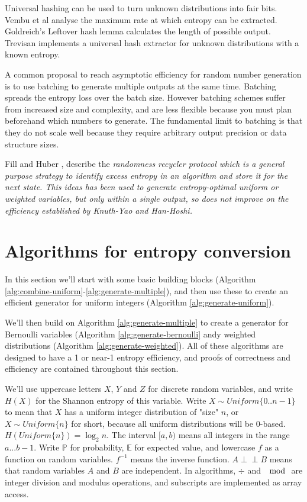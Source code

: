 \documentclass[12pt]{article}
\newcommand{\indep}{\perp\!\!\!\perp}
\begin{document}
Universal hashing can be used to turn unknown distributions into fair bits. Vembu et al \cite{vembu95} analyse the maximum rate at which entropy can be extracted. Goldreich's Leftover hash lemma \cite{goldreich2004foundations} calculates the length of possible output. Trevisan \cite{trevisan2001extractors} implements a universal hash extractor for unknown distributions with a known entropy. 

A common proposal to reach asymptotic efficiency for random number generation is to use batching to generate multiple outputs at the same time. \cite{bacher2017,han97,devroye86,Knuth1976TheCO,lumbroso2013optimal} Batching spreads the entropy loss over the batch size. However batching schemes suffer from increased size and complexity, and are less flexible because you must plan beforehand which numbers to generate. The fundamental limit to batching is that they do not scale well because they require arbitrary output precision or data structure sizes.

Fill and Huber \cite{fill2000randomness, huber2016perfect}, describe the \em randomness recycler \em protocol which is a general purpose strategy to identify excess entropy in an algorithm and store it for the next state. This ideas has been used to generate entropy-optimal uniform \cite{lumbroso2013optimal, huber2024optimal} or weighted \cite{huber2024optimal} variables, but only within a single output, so does not improve on the efficiency established by Knuth-Yao and Han-Hoshi.


\section{Algorithms for entropy conversion}

In this section we'll start with some basic building blocks (Algorithm \ref{alg:combine-uniform}-\ref{alg:generate-multiple}), and then use these to create an efficient generator for uniform integers (Algorithm \ref{alg:generate-uniform}).

We'll then build on Algorithm \ref{alg:generate-multiple} to create a generator for Bernoulli variables (Algorithm \ref{alg:generate-bernoulli} andy weighted distributions (Algorithm \ref{alg:generate-weighted}). All of these algorithms are designed to have a 1 or near-1 entropy efficiency, and proofs of correctness and efficiency are contained throughout this section.

We'll use uppercase letters $X$, $Y$ and $Z$ for discrete random variables, and write $H(X)$ for the Shannon entropy of this variable. Write $X \sim Uniform\{0..n-1\}$ to mean that $X$ has a uniform integer distribution of "size" $n$, or $X \sim Uniform\{n\}$ for short, because all uniform distributions will be 0-based. $H(Uniform\{n\}) = \log_2n$. The interval $[a,b)$ means all integers in the range $a...b-1$. Write $\mathbb{P}$ for probability, $\mathbb{E}$ for expected value, and lowercase $f$ as a function on random variables. $f^{-1}$ means the inverse function. $A \indep B$ means that random variables $A$ and $B$ are independent. In algorithms, $\div$ and $\mod$ are integer division and modulus operations, and subscripts are implemented as array access.
\end{document}
